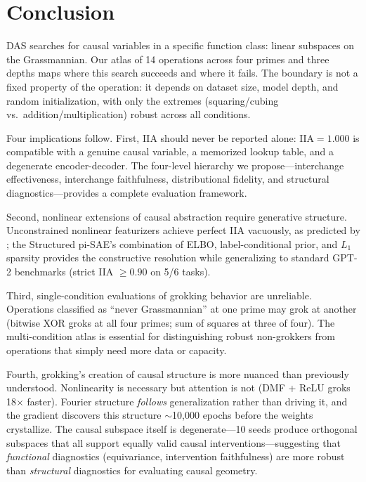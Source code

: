 \documentclass{article}
\newcommand{\IIA}{\mathrm{IIA}}
\begin{document}
\section{Conclusion}
\label{sec:conclusion}

DAS searches for causal variables in a specific function class: linear
subspaces on the Grassmannian. Our atlas of 14 operations across four primes
and three depths maps where this search succeeds and where it fails. The
boundary is not a fixed property of the operation: it depends on dataset
size, model depth, and random initialization, with only the extremes
(squaring/cubing vs.\ addition/multiplication) robust across all conditions.

Four implications follow. First, IIA should never be reported alone:
$\IIA = 1.000$ is compatible with a genuine causal variable, a memorized
lookup table, and a degenerate encoder-decoder. The four-level hierarchy we
propose---interchange effectiveness, interchange faithfulness, distributional
fidelity, and structural diagnostics---provides a complete evaluation
framework.

Second, nonlinear extensions of causal abstraction require generative
structure. Unconstrained nonlinear featurizers achieve perfect IIA vacuously,
as predicted by \citet{sutter2025nonlinear}; the Structured pi-SAE's
combination of ELBO, label-conditional prior, and $L_1$ sparsity provides
the constructive resolution while generalizing to standard GPT-2 benchmarks
(strict IIA $\geq 0.90$ on 5/6 tasks).

Third, single-condition evaluations of grokking behavior are unreliable.
Operations classified as ``never Grassmannian'' at one prime may grok at
another (bitwise XOR groks at all four primes; sum of squares at three of
four). The multi-condition atlas is essential for distinguishing robust
non-grokkers from operations that simply need more data or capacity.

Fourth, grokking's creation of causal structure is more nuanced than
previously understood. Nonlinearity is necessary but attention is not (DMF +
ReLU groks 18$\times$ faster). Fourier structure \emph{follows}
generalization rather than driving it, and the gradient discovers this
structure $\sim$10{,}000 epochs before the weights crystallize. The causal
subspace itself is degenerate---10 seeds produce orthogonal subspaces that
all support equally valid causal interventions---suggesting that
\emph{functional} diagnostics (equivariance, intervention faithfulness) are
more robust than \emph{structural} diagnostics for evaluating causal
geometry.
\end{document}
